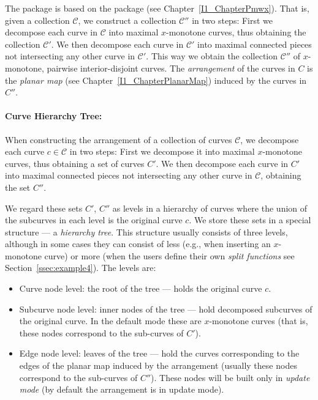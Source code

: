 The  package is based on the  package (see Chapter~\ref{I1_ChapterPmwx}). That is, given
a collection ${\mathcal C}$, we construct a collection 
${\mathcal C}''$ in two steps: First we decompose each curve in 
${\mathcal C}$ into maximal $x$-monotone curves, thus obtaining the 
collection ${\mathcal C}'$. We then decompose each curve in ${\mathcal C}'$ 
into maximal connected pieces not intersecting any other curve in 
${\mathcal C}'$. This way we obtain the collection ${\mathcal C}''$ of 
$x$-monotone, pairwise interior-disjoint curves.
The {\em arrangement} of the curves in $C$ is the
{\it planar map} (see Chapter~\ref{I1_ChapterPlanarMap})
induced by the curves in $C''$.

\paragraph{Curve Hierarchy Tree:} When constructing the arrangement of a
collection of curves ${\mathcal C}$, we decompose each curve $c \in 
{\mathcal C}$ in two steps: First we decompose it into maximal $x$-monotone 
curves, thus obtaining a set of curves $C'$. We then decompose each curve 
in $C'$ into maximal connected pieces not intersecting any other curve in 
${\mathcal C}$, obtaining the set $C''$.

We regard these sets $C'$, $C''$ as levels in a hierarchy of curves where the 
union of the subcurves in each level is the original curve $c$. We store these
sets in a special structure --- a {\em hierarchy tree}. This structure 
usually consists of three levels, although in some cases they can consist 
of less (e.g., when inserting an $x$-monotone curve) or more (when the users 
define their own {\em split functions} see Section~\ref{ssec:example4}). 
The levels are:
\begin{itemize}
\item Curve node level: the root of the tree --- holds the original curve $c$.
\item Subcurve node level: inner nodes of the tree --- hold decomposed
subcurves of the original curve. In the default mode these are $x$-monotone 
curves (that is, these nodes correspond to the sub-curves of $C'$).
\item Edge node level: leaves of the tree --- hold the curves corresponding to
the edges of the planar map induced by the arrangement (usually these nodes 
correspond to the sub-curves of $C''$). \newline
These nodes will be built only in {\em update mode} (by default the 
arrangement is in update mode).
\end{itemize}

